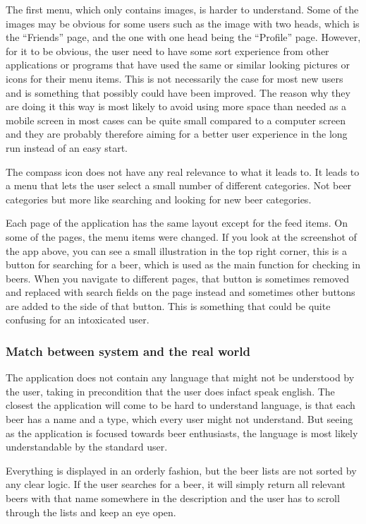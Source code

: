 \documentclass[12pt]{article}
\begin{document}
The first menu, which only contains images, is harder to understand. Some of the
images may be obvious for some users such as the image with two heads, which is
the “Friends” page, and the one with one head being the “Profile” page. However,
for it to be obvious, the user need to have some sort experience from other
applications or programs that have used the same or similar looking pictures or
icons for their menu items. This is not necessarily the case for most new users
and is something that possibly could have been improved. The reason why they are
doing it this way is most likely to avoid using more space than needed as a
mobile screen in most cases can be quite small compared to a computer screen and
they are probably therefore aiming for a better user experience in the long run
instead of an easy start.


The compass icon does not have any real relevance to what it leads to. It leads
to a menu that lets the user select a small number of different categories. Not
beer categories but more like searching and looking for new beer categories. 


Each page of the application has the same layout except for the feed items. On some of
the pages, the menu items were changed. If you look at the screenshot of the app
above, you can see a small illustration in the top right corner, this is a
button for searching for a beer, which is used as the main function for checking
in beers.  When you navigate to different pages, that button is sometimes
removed and replaced with search fields on the page instead and sometimes other
buttons are added to the side of that button. This is something that could be
quite confusing for an intoxicated user. 




\subsubsection{Match between system and the real world}
The application does not contain any language that might not be understood by
the user, taking in precondition that the user does infact speak english. The
closest the application will come to be hard to understand language, is that
each beer has a name and a type, which every user might not understand. But
seeing as the application is focused towards beer enthusiasts, the language is
most likely understandable by the standard user.


Everything is displayed in an orderly fashion, but the beer lists are not sorted
by any clear logic. If the user searches for a beer, it will simply return all
relevant beers with that name somewhere in the description and the user has to
scroll through the lists and keep an eye open. 
\end{document}
